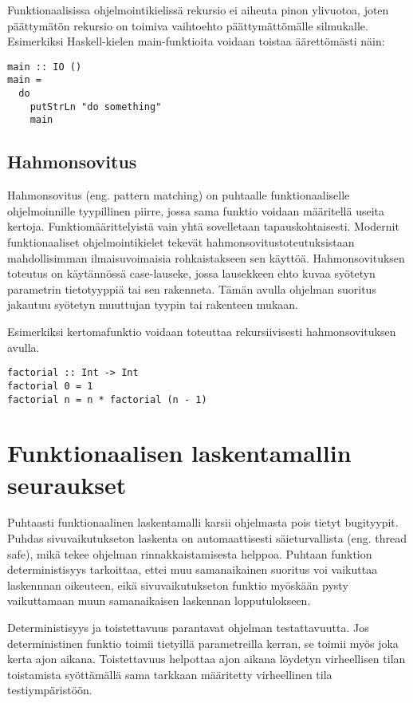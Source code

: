 Funktionaalisissa ohjelmointikielissä rekursio ei aiheuta pinon ylivuotoa, joten päättymätön rekursio on toimiva
vaihtoehto päättymättömälle silmukalle. Esimerkiksi Haskell-kielen main-funktioita voidaan toistaa äärettömästi näin:
\begin{verbatim}
main :: IO ()
main =
  do
    putStrLn "do something"
    main
\end{verbatim}

\subsection{Hahmonsovitus}
Hahmonsovitus (eng. pattern matching) on puhtaalle funktionaaliselle ohjelmoinnille tyypillinen piirre, jossa sama
funktio voidaan määritellä useita kertoja. Funktiomäärittelyistä vain yhtä sovelletaan tapauskohtaisesti. Modernit
funktionaaliset ohjelmointikielet tekevät hahmonsovitustoteutuksistaan mahdollisimman ilmaisuvoimaisia rohkaistakseen
sen käyttöä. Hahmonsovituksen toteutus on käytännössä case-lauseke, jossa lausekkeen ehto kuvaa syötetyn parametrin
tietotyyppiä tai sen rakenneta. Tämän avulla ohjelman suoritus jakautuu syötetyn muuttujan tyypin tai rakenteen mukaan.
\cite{hudak}

Esimerkiksi kertomafunktio voidaan toteuttaa rekursiivisesti hahmonsovituksen avulla.
\begin{verbatim}
factorial :: Int -> Int
factorial 0 = 1
factorial n = n * factorial (n - 1)
\end{verbatim}

\section{Funktionaalisen laskentamallin seuraukset}
Puhtaasti funktionaalinen laskentamalli karsii ohjelmasta pois tietyt bugityypit. Puhdas sivuvaikutukseton laskenta on
automaattisesti säieturvallista (eng. thread safe), mikä tekee ohjelman rinnakkaistamisesta helppoa. Puhtaan funktion
deterministisyys tarkoittaa, ettei muu samanaikainen suoritus voi vaikuttaa laskennnan oikeuteen, eikä sivuvaikutukseton
funktio myöskään pysty vaikuttamaan muun samanaikaisen laskennan lopputulokseen.

Deterministisyys ja toistettavuus parantavat ohjelman testattavuutta. Jos deterministinen funktio toimii tietyillä
parametreilla kerran, se toimii myös joka kerta ajon aikana. Toistettavuus helpottaa ajon aikana löydetyn virheellisen
tilan toistamista syöttämällä sama tarkkaan määritetty virheellinen tila testiympäristöön.\cite{functionaljava}

